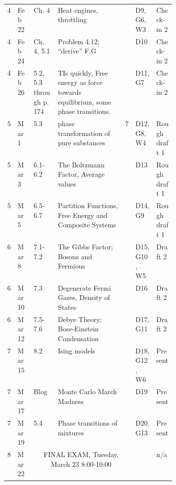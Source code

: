 \documentclass[12pt]{article}
\begin{document}
{\begin{table}[]
\begin{tabular}{p{.03\linewidth}|p{.065\linewidth}|p{.065\linewidth}|p{0.4\linewidth}|p{.08\linewidth}|p{.085\linewidth}|p{.1\linewidth}}
4    & Feb 22 & Ch. 4 &Heat engines, throttling &                                           & D9, G6, W3   & Check-in 2    \\
4    & Feb 24 &Ch. 4, 5.1 & Problem 4.12; ``derive'' F,G  &                                           & D10          & Check-in 2    \\
4    & Feb 26 & 5.2, 5.3 through p. 174 &TIs quickly, Free energy as force towards equilibrium, some phase transitions. &                                                                                     & D11, G7      & Check-in 2    \\ \hline
5    & Mar 1  & 5.3 & phase transformation of pure substances & 7                                       & D12, G8, W4  & Rough draft 1 \\
5    & Mar 3  & 6.1-6.2 &The Boltzmann Factor, Average values       &                                           & D13          & Rough draft 1 \\
5    & Mar 5  & 6.5-6.7        & Partition Functions, Free Energy and Composite Systems &                                           & D14, G9      & Rough draft 1 \\ \hline
6    & Mar 8  &  7.1-7.2        & The Gibbs Factor; Bosons and Fermions                            &                                           & D15, G10, W5 & Draft 2 \\
6    & Mar 10 &  7.3            & Degenerate Fermi Gases, Density of States                                                       &                                           & D16          & Draft 2 \\ 
6    & Mar 12 &  7.5-7.6        & Debye Theory; Bose-Einstein Condensation                        &                                           & D17, G11     & Draft 2 \\ \hline
7    & Mar 15 & 8.2            & Ising models &                                           & D18, G12, W6 & Present \\ \hline \hline
7    & Mar 17 & Blog &Monte Carlo March Madness &                                           & D19          & Present \\
7    & Mar 19 &5.4          &Phase transitions of mixtures &                                           & D20, G13     & Present \\ \hline
8    & Mar 22 & \multicolumn{3}{c}{FINAL EXAM, Tuesday, March 23 8:00-10:00}                                                                                                    & &n/a          
\end{tabular}
\end{table}

}
\end{document}
